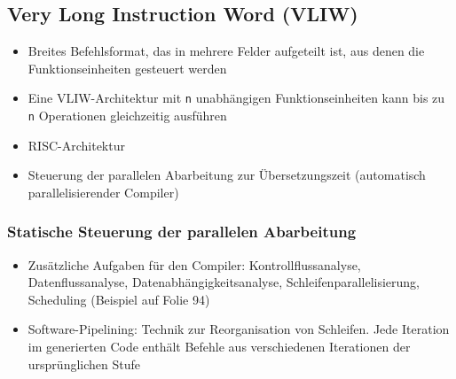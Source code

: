\subsection{Very Long Instruction Word (VLIW)}
\begin{itemize}
	\item Breites Befehlsformat, das in mehrere Felder aufgeteilt ist, aus denen die Funktionseinheiten gesteuert werden
	\item Eine VLIW-Architektur mit \texttt{n} unabhängigen Funktionseinheiten kann bis zu \texttt{n} Operationen gleichzeitig ausführen
	\item RISC-Architektur
	\item Steuerung der parallelen Abarbeitung zur Übersetzungszeit (automatisch parallelisierender Compiler)
\end{itemize}

\subsubsection{Statische Steuerung der parallelen Abarbeitung}
\begin{itemize}
	\item Zusätzliche Aufgaben für den Compiler: Kontrollflussanalyse, Datenflussanalyse, Datenabhängigkeitsanalyse, Schleifenparallelisierung, Scheduling (Beispiel auf Folie 94)
	\item Software-Pipelining: Technik zur Reorganisation von Schleifen. Jede Iteration im generierten Code enthält Befehle aus verschiedenen Iterationen der ursprünglichen Stufe
\end{itemize}

